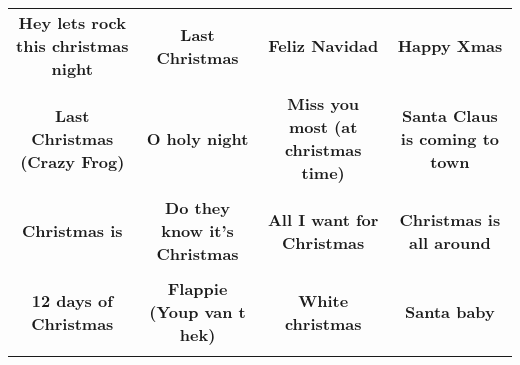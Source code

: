 \documentclass[12pt]{article} \usepackage{eso-pic, graphicx}
\newcommand{\background}[1]{%
\AddToShipoutPictureBG*{\texttt{[image: \#1]}}
}
\begin{document}
\tabcolsep=30.2pt \renewcommand{\arraystretch}{4.5}   \vspace*{4.3cm} \begin{center}  \begin{tabular}{c c c c}
\parbox{3cm}{\centering \textbf{Hey lets rock this christmas night}}& 
\parbox{3cm}{\centering \textbf{Last Christmas}}& 
\parbox{3cm}{\centering \textbf{Feliz Navidad}}& 
\parbox{3cm}{\centering \textbf{Happy Xmas}}\\ \\ 
\parbox{3cm}{\centering \textbf{Last Christmas (Crazy Frog)}}& 
\parbox{3cm}{\centering \textbf{O holy night}}& 
\parbox{3cm}{\centering \textbf{Miss you most (at christmas time)}}& 
\parbox{3cm}{\centering \textbf{Santa Claus is coming to town}}\\ \\ 
\parbox{3cm}{\centering \textbf{Christmas is}}& 
\parbox{3cm}{\centering \textbf{Do they know it's Christmas}}& 
\parbox{3cm}{\centering \textbf{All I want for Christmas}}& 
\parbox{3cm}{\centering \textbf{Christmas is all around}}\\ \\ 
\parbox{3cm}{\centering \textbf{12 days of Christmas}}& 
\parbox{3cm}{\centering \textbf{Flappie (Youp van t hek)}}& 
\parbox{3cm}{\centering \textbf{White christmas}}& 
\parbox{3cm}{\centering \textbf{Santa baby}}\\ \\ 
\end{tabular} \background{discobingo.pdf} \end{center} 
\end{document}
